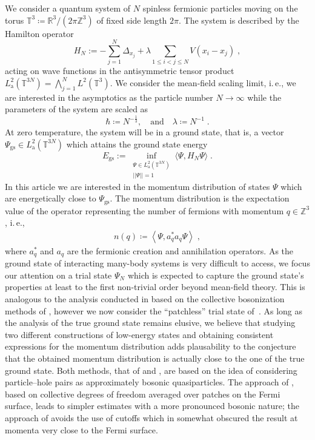 \documentclass[12pt,a4paper]{article}
\numberwithin{equation}{section}
\newcommand{\Zbb}{\mathbb{Z}}
\newcommand{\1}{\mathbb{I}}
\newcommand{\GS}{\mathrm{gs}}
\newcommand{\Rbb}{\mathbb{R}}
\newcommand{\T}{\mathbb{T}}
\newcommand{\eva}[1]{\left\langle #1 \right\rangle}
\theoremstyle{plain}
\theoremstyle{definition}
\theoremstyle{remark}
\theoremstyle{plain}
\theoremstyle{definition}
\theoremstyle{remark}
\begin{document}
We consider a quantum system of $N$ spinless fermionic particles moving on the torus $\mathbb{T}^3\coloneq \Rbb^3/ (2\pi \Zbb^3)$ of fixed side length $2\pi$. The system is described by the Hamilton operator
\begin{equation}
	H_N := - \sum_{j=1}^{N}\Delta_{x_j} + \lambda \sum_{1\leq i < j \leq N } V(x_i - x_j) \;,
\end{equation}
acting on wave functions in the antisymmetric tensor product $L^2_{\mathrm{a}}(\T^{3N}) = \bigwedge_{j=1}^N L^2(\T^3)$.
We consider the mean-field scaling limit, i.\,e., we are interested in the asymptotics as the particle number $N \to \infty$ while the parameters of the system are scaled as
\begin{equation}
	\hbar\coloneq N^{-\frac{1}{3}}, \quad\text{and}\quad \lambda \coloneq N^{-1} \;.
\end{equation}
At zero temperature, the system will be in a ground state, that is, a vector $ \Psi_{\GS} \in L^2_{\mathrm{a}}(\T^{3N}) $ which attains the ground state energy
\begin{equation} \label{eq:EGS}
	E_{\GS}
	:= \inf_{\substack{\Psi \in L^2_{\mathrm{a}}(\T^{3N}) \\||\Psi|| = 1}} \langle \Psi, H_N \Psi \rangle \;.
\end{equation}
In this article we are interested in the momentum distribution of states $ \Psi $ which are energetically close to $ \Psi_{\GS} $. The momentum distribution is the expectation value of the operator representing the number of fermions with momentum $q \in \Zbb^3$, i.\,e.,
\begin{align}
	n(q) \coloneq \eva{\Psi, a^*_q a_q \Psi} \;,
\end{align}
where $ a_q^*$ and $a_q $ are the fermionic creation and annihilation operators. As the ground state of interacting many-body systems is very difficult to access, we focus our attention on a trial state $ \Psi_N $ which is expected to capture the ground state's properties at least to the first non-trivial order beyond mean-field theory. This is analogous to the analysis conducted in \cite{BL25} based on the collective bosonization methods of \cite{BNPSS20,BNPSS21}, however we now consider the ``patchless'' trial state of~\cite{CHN23}. As long as the analysis of the true ground state remains elusive, we believe that studying two different constructions of low-energy states and obtaining consistent expressions for the momentum distribution adds plausability to the conjecture that the obtained momentum distribution is actually close to the one of the true ground state. Both methods, that of \cite{BL25} and \cite{CHN23}, are based on the idea of considering particle--hole pairs as approximately bosonic quasiparticles. The approach of \cite{BNPSS20,BNPSS21}, based on collective degrees of freedom averaged over patches on the Fermi surface, leads to simpler estimates with a more pronounced bosonic nature; the approach of \cite{CHN23} avoids the use of cutoffs which in \cite{BL25} somewhat obscured the result at momenta very close to the Fermi surface.
\end{document}
